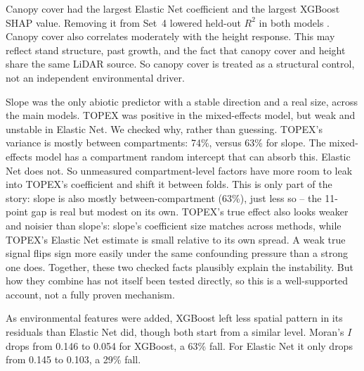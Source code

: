 Canopy cover had the largest Elastic Net coefficient and the largest XGBoost SHAP value. Removing
it from Set~4 lowered held-out $R^2$ in both models . Canopy cover also correlates moderately with the height response. This
may reflect stand structure, past growth, and the fact that canopy cover and height share the same
LiDAR source. So canopy cover is treated as a structural control, not an independent environmental
driver.

Slope was the only abiotic predictor with a stable direction and a real size, across the main
models. TOPEX was positive in the mixed-effects model, but weak and unstable in Elastic Net. We
checked why, rather than guessing. TOPEX's variance is mostly between compartments: 74\%, versus
63\% for slope. The mixed-effects model has a compartment random intercept that can absorb this.
Elastic Net does not. So unmeasured compartment-level factors have more room to leak into TOPEX's
coefficient and shift it between folds. This is only part of the story: slope is also mostly
between-compartment (63\%), just less so -- the 11-point gap is real but modest on its own.
TOPEX's true effect also looks weaker and noisier than slope's: slope's coefficient size matches
across methods, while TOPEX's Elastic Net estimate is small relative to its own spread. A weak
true signal flips sign more easily under the same confounding pressure than a strong one does.
Together, these two checked facts plausibly explain the instability. But how they combine has not
itself been tested directly, so this is a well-supported account, not a fully proven mechanism.

As environmental features were added, XGBoost left less spatial pattern in its residuals than
Elastic Net did, though both start from a similar level. Moran's $I$ drops from 0.146 to 0.054 for
XGBoost, a 63\% fall. For Elastic Net it only drops from 0.145 to 0.103, a 29\% fall.  

